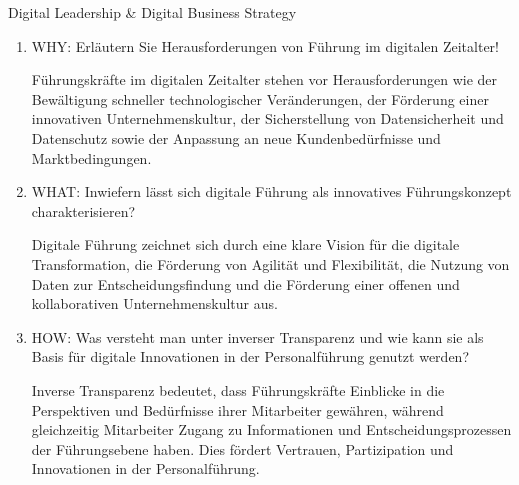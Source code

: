 \documentclass{article}
\begin{document}
\begin{exercise}{Digital Leadership \& Digital Business Strategy}
\begin{enumerate}
    \item WHY: Erläutern Sie Herausforderungen von Führung im digitalen Zeitalter!
          \begin{solution}
            Führungskräfte im digitalen Zeitalter stehen vor Herausforderungen wie der Bewältigung schneller technologischer Veränderungen, der Förderung einer innovativen Unternehmenskultur, der Sicherstellung von Datensicherheit und Datenschutz sowie der Anpassung an neue Kundenbedürfnisse und Marktbedingungen.
          \end{solution}

    \item WHAT: Inwiefern lässt sich digitale Führung als innovatives Führungskonzept charakterisieren?
          \begin{solution}
            Digitale Führung zeichnet sich durch eine klare Vision für die digitale Transformation, die Förderung von Agilität und Flexibilität, die Nutzung von Daten zur Entscheidungsfindung und die Förderung einer offenen und kollaborativen Unternehmenskultur aus.
          \end{solution}

    \item HOW: Was versteht man unter inverser Transparenz und wie kann sie als Basis für digitale Innovationen in der Personalführung genutzt werden?
          \begin{solution}
            Inverse Transparenz bedeutet, dass Führungskräfte Einblicke in die Perspektiven und Bedürfnisse ihrer Mitarbeiter gewähren, während gleichzeitig Mitarbeiter Zugang zu Informationen und Entscheidungsprozessen der Führungsebene haben. Dies fördert Vertrauen, Partizipation und Innovationen in der Personalführung.
          \end{solution}
  \end{enumerate}
\end{exercise}
\end{document}
